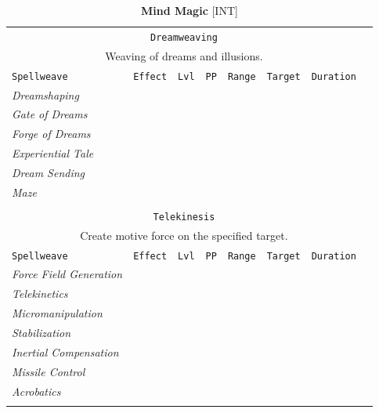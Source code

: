 \documentclass[10pt,a4paper]{article}
\begin{document}
\newpage
\begin{table}[htbp!]
\caption*{\textbf{\Large{Mind Magic}} [INT]}
\begin{tabular}{llllllll}
 \multicolumn{7}{c}{\texttt{Dreamweaving}}\\
  \multicolumn{7}{c}{Weaving of dreams and illusions.}\\
    \hline
 \texttt{Spellweave} & \texttt{Effect} & \texttt{Lvl} & \texttt{PP} & \texttt{Range} & \texttt{Target} & \texttt{Duration} \\
    \hline
    \multirow{1}{*}{\textit{Dreamshaping}}&  & &&  &  & \\
    \hline
    \multirow{1}{*}{\textit{Gate of Dreams}}&  & &&  &  & \\
    \hline
    \multirow{1}{*}{\textit{Forge of Dreams}}&  & &&  &  & \\    
    \hline
    \multirow{1}{*}{\textit{Experiential Tale}}&  & &&  &  & \\
    \hline
    \multirow{1}{*}{\textit{Dream Sending}}&  & &&  &  & \\
    \hline
    \multirow{1}{*}{\textit{Maze}}&  & &&  &  & \\
	&&&&&&\\
	
	
 \multicolumn{7}{c}{\texttt{Telekinesis}}\\
  \multicolumn{7}{c}{Create motive force on the specified target.}\\
    \hline
 \texttt{Spellweave} & \texttt{Effect} & \texttt{Lvl} & \texttt{PP} & \texttt{Range} & \texttt{Target} & \texttt{Duration} \\
    \hline
    \multirow{1}{*}{\textit{Force Field Generation}}&  & &&  &  & \\
    \hline
    \multirow{1}{*}{\textit{Telekinetics}}&  & &&  &  & \\
    \hline
    \multirow{1}{*}{\textit{Micromanipulation}}&  & &&  &  & \\
    \hline
    \multirow{1}{*}{\textit{Stabilization}}&  & &&  &  & \\
    \hline
    \multirow{1}{*}{\textit{Inertial Compensation}}&  & &&  &  & \\
    \hline
    \multirow{1}{*}{\textit{Missile Control}}&  & &&  &  & \\
    \hline
    \multirow{1}{*}{\textit{Acrobatics}}&  & &&  &  & \\        
	&&&&&&\\
	

\end{tabular}
\end{table}
\end{document}
